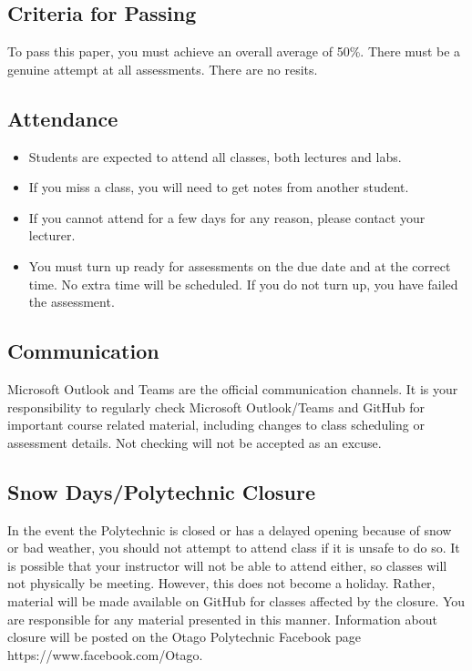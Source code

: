\documentclass{article}
\begin{document}
\subsection*{Criteria for Passing}
To pass this paper, you must achieve an overall average of 50\%. There must be a genuine attempt at all assessments. There are no resits.

\subsection*{Attendance}
\begin{itemize}
    \item Students are expected to attend all classes, both lectures and labs.
    \item If you miss a class, you will need to get notes from another student.
    \item If you cannot attend for a few days for any reason, please contact your lecturer.
    \item You must turn up ready for assessments on the due date and at the correct time. No
    extra time will be scheduled. If you do not turn up, you have failed the assessment.
  \end{itemize}

  \subsection*{Communication}
Microsoft Outlook and Teams are the official communication channels. It is your responsibility to regularly check Microsoft Outlook/Teams and GitHub for important course related material, including changes to class scheduling or assessment details. Not checking will not be accepted as an excuse.

\subsection*{Snow Days/Polytechnic Closure}
In the event the Polytechnic is closed or has a delayed opening because of snow or bad weather, you should not attempt to attend class if it is unsafe to do so. It is possible that your instructor will not be able to attend either, so classes will not physically be meeting. However, this does not become a holiday. Rather, material will be made available on GitHub for classes affected by the closure. You are responsible for any material presented in this manner. Information about closure will be posted on the Otago Polytechnic Facebook page https://www.facebook.com/Otago.
\end{document}
